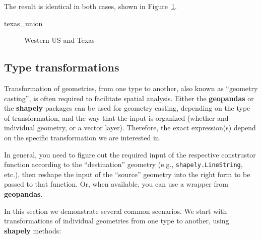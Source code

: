 \documentclass[
  letterpaper,
]{krantz}
\newenvironment{Shaded}{\begin{snugshade}}{\end{snugshade}}
\newcommand{\NormalTok}[1]{\textcolor[rgb]{0.00,0.23,0.31}{#1}}
\begin{document}
The result is identical in both cases, shown in
Figure~\ref{fig-dissolve3}.

\begin{Shaded}
\begin{Highlighting}[]
\NormalTok{texas\_union}
\end{Highlighting}
\end{Shaded}

\begin{figure}[H]


\caption{\label{fig-dissolve3}Western US and Texas}

\end{figure}%

\subsection{Type transformations}\label{sec-type-transformations}

Transformation of geometries, from one type to another, also known as
``geometry casting'', is often required to facilitate spatial analysis.
Either the \textbf{geopandas} or the \textbf{shapely} packages can be
used for geometry casting, depending on the type of transformation, and
the way that the input is organized (whether and individual geometry, or
a vector layer). Therefore, the exact expression(s) depend on the
specific transformation we are interested in.

In general, you need to figure out the required input of the respective
construstor function according to the ``destination'' geometry (e.g.,
\texttt{shapely.LineString}, etc.), then reshape the input of the
``source'' geometry into the right form to be passed to that function.
Or, when available, you can use a wrapper from \textbf{geopandas}.

In this section we demonstrate several common scenarios. We start with
transformations of individual geometries from one type to another, using
\textbf{shapely} methods:
\end{document}

